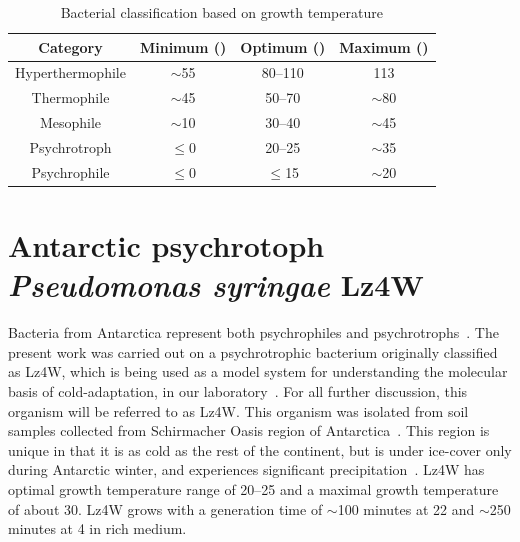 \begin{table}[tbp]
\linespread{1}\normalsize
\renewcommand{\arraystretch}{1.2}
\begin{minipage}[c]{\textwidth}
\renewcommand{\footnoterule}{}
\renewcommand{\footnotesep}{0pt}
\caption[Bacterial classification based on growth temperature]
{Bacterial classification based on growth temperature}
\label{chap1_therm}
\begin{narrow}{-1in}{-1in}
\centering
\begin{small}
\begin{tabularx}{\textwidth}{@{}cccc@{}}\toprule
\textbf{Category} & \textbf{Minimum (\dg{})} & \textbf{Optimum
(\dg{})} & \textbf{Maximum (\dg{})} \\\midrule
Hyperthermophile & $\sim$55 & 80--110 & 113 \\
Thermophile & $\sim$45 & 50--70 & $\sim$80 \\
Mesophile & $\sim$10 & 30--40 & $\sim$45 \\
Psychrotroph & $\leq$0 & 20--25 & $\sim$35 \\
Psychrophile & $\leq$0 & $\leq$15 & $\sim$20 \\\bottomrule

\end{tabularx}
\end{small}
\end{narrow}
\end{minipage}
\renewcommand{\arraystretch}{1.0}
\linespread{1.1}\normalsize
\end{table}


\section{Antarctic psychrotoph \emph{Pseudomonas syringae} Lz4W}
Bacteria from Antarctica represent both psychrophiles and
psychrotrophs~\citep{Wynn1990}. The present work was carried out
on a psychrotrophic bacterium originally classified as
 Lz4W, which is being used as a model
system for understanding the molecular basis of cold-adaptation,
in our laboratory~\citep{Ray1998}. For all further discussion,
this organism will be referred to as Lz4W. This organism was
isolated from soil samples collected from Schirmacher Oasis region
of Antarctica~\citep{Shivaji1989}. This region is unique in that
it is as cold as the rest of the continent, but is under ice-cover
only during Antarctic winter, and experiences significant
precipitation~\citep{Shivaji1989}. Lz4W has optimal growth
temperature range of 20--25\dg{} and a maximal growth temperature
of about 30\dg{}. Lz4W grows with a generation time of $\sim$100
minutes at 22\dg{} and $\sim$250 minutes at 4\dg{} in rich medium.

